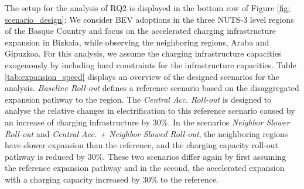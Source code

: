 \documentclass[preprint,review,11pt, authoryear]{elsarticle}
\begin{document}
        The setup for the analysis of RQ2 is displayed in the bottom row of Figure \ref{fig: scenario_design}: We consider BEV adoptions in the three NUTS-3 level regions of the Basque Country and focus on the accelerated charging infrastructure expansion in Bizkaia, while observing the neighboring regions, Araba and Gipuzkoa. For this analysis, we assume the charging infrastructure capacities exogenously by including hard constraints for the infrastructure capacities. Table \ref{tab:expansion_speed} displays an overview of the designed scenarios for the analysis. \textit{Baseline Roll-out} defines a reference scenario based on the disaggregated expansion pathway to the region. The \textit{Central Acc. Roll-out} is designed to analyse the relative changes in electrification to this reference scenario caused by an increase of charging infrastructure by 30\%. In the scenarios \textit{Neighbor Slower Roll-out} and \textit{Central Acc. + Neighbor Slowed Roll-out}, the neighboring regions have slower expansion than the reference, and the charging capacity roll-out pathway is reduced by \deleted{-}$30\%$. These two scenarios differ again by first assuming the reference expansion pathway and in the second, the accelerated expansion with a charging capacity increased by $30\%$ to the reference. 
\end{document}
